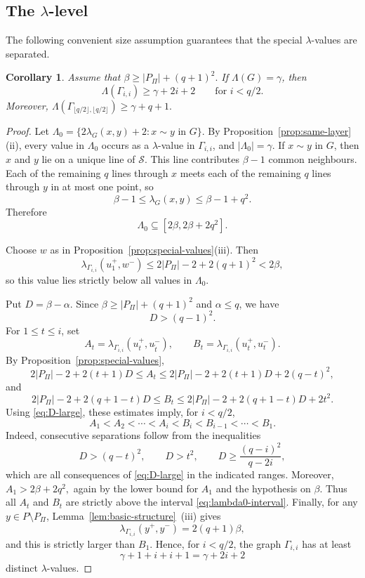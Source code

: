 \documentclass[reqno,a4paper,11pt]{article}
\newtheorem{cor}[thm]{Corollary}
\theoremstyle{definition}
\theoremstyle{remark}
\begin{document}
\subsection{The $\lambda$-level}
The following convenient size assumption guarantees that the special \(\lambda\)-values are separated.
\begin{cor}\label{cor:tpl-level}
Assume that
$\beta\ge |P_\Pi|+(q+1)^2.$
If $\Lambda(G)=\gamma$, then
\[
\Lambda(\Gamma_{i,i})\ge \gamma+2i+2
\qquad\text{for } i<q/2.
\]
Moreover,
$\Lambda(\Gamma_{\lfloor q/2\rfloor,\lfloor q/2\rfloor})\ge \gamma+q+1.$
\end{cor}

\begin{proof}
Let
$\Lambda_0=
\{2\lambda_G(x,y)+2:x\sim y\text{ in }G\}.$
By Proposition~\ref{prop:same-layer}(ii), every value in $\Lambda_0$ occurs as a $\lambda$-value in $\Gamma_{i,i}$, and $|\Lambda_0|=\gamma$.
If $x\sim y$ in $G$, then $x$ and $y$ lie on a unique line of $\mathcal S$.
This line contributes $\beta-1$ common neighbours.
Each of the remaining $q$ lines through $x$ meets each of the remaining $q$ lines through $y$ in at most one point, so
\[
\beta-1\le \lambda_G(x,y)\le \beta-1+q^2.
\]
Therefore
\begin{equation}\label{eq:lambda0-interval}
\Lambda_0\subseteq [2\beta,2\beta+2q^2].
\end{equation}

Choose $w$ as in Proposition~\ref{prop:special-values}(iii).
Then
\[
\lambda_{\Gamma_{i,i}}(u_1^+,w^-)
\le 2|P_\Pi|-2+2(q+1)^2
<2\beta,
\]
so this value lies strictly below all values in $\Lambda_0$.

Put
$D=\beta-\alpha.$
Since $\beta\ge |P_\Pi|+(q+1)^2$ and $\alpha\le q$, we have
\begin{equation}\label{eq:D-large}
D>(q-1)^2.
\end{equation}
For $1\le t\le i$, set
\[
A_t=\lambda_{\Gamma_{i,i}}(u_t^+,u_{\widetilde t}^-),
\qquad
B_t=\lambda_{\Gamma_{i,i}}(u_t^+,u_t^-).
\]
By Proposition~\ref{prop:special-values},
\[
2|P_\Pi|-2+2(t+1)D
\le A_t
\le
2|P_\Pi|-2+2(t+1)D+2(q-t)^2,
\]
and
\[
2|P_\Pi|-2+2(q+1-t)D
\le B_t
\le
2|P_\Pi|-2+2(q+1-t)D+2t^2.
\]
Using \eqref{eq:D-large}, these estimates imply, for $i<q/2$,
\[
A_1<A_2<\cdots<A_i<B_i<B_{i-1}<\cdots<B_1.
\]
Indeed, consecutive separations follow from the inequalities
\[
D>(q-t)^2,
\qquad
D>t^2,
\qquad
D\ge \frac{(q-i)^2}{q-2i},
\]
which are all consequences of \eqref{eq:D-large} in the indicated ranges.
Moreover,
$A_1>2\beta+2q^2,$
again by the lower bound for $A_1$ and the hypothesis on $\beta$.
Thus all $A_t$ and $B_t$ are strictly above the interval \eqref{eq:lambda0-interval}.
Finally, for any $y\in P\setminus P_\Pi$, Lemma~\ref{lem:basic-structure}~(iii) gives
$$\lambda_{\Gamma_{i,i}}(y^+,y^-)=2(q+1)\beta,$$
and this is strictly larger than $B_1$.
Hence, for $i<q/2$, the graph $\Gamma_{i,i}$ has at least
\[
\gamma+1+i+i+1=\gamma+2i+2
\]
distinct $\lambda$-values.


\end{proof}
\end{document}
